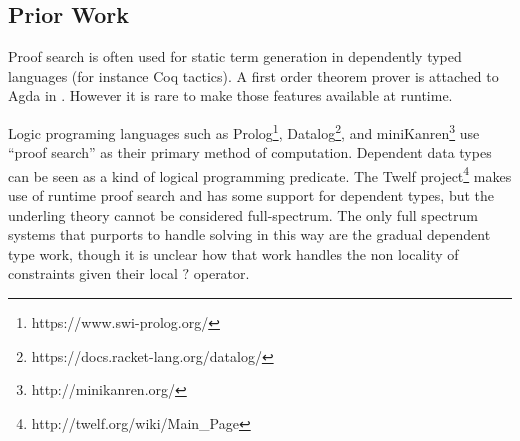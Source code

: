 \subsection{Prior Work}

Proof search is often used for static term generation in dependently
typed languages (for instance Coq tactics). A first order theorem
prover is attached to Agda in \cite{norell2007towards}. However it
is rare to make those features available at runtime. 

Logic programing languages such as Prolog\footnote{https://www.swi-prolog.org/},
Datalog\footnote{https://docs.racket-lang.org/datalog/}, and miniKanren\footnote{http://minikanren.org/}
use ``proof search'' as their primary method of computation. Dependent
data types can be seen as a kind of logical programming predicate.
The Twelf project\footnote{http://twelf.org/wiki/Main\_Page} makes
use of runtime proof search and has some support for dependent types,
but the underling theory cannot be considered full-spectrum. The only
full spectrum systems that purports to handle solving in this way
are the gradual dependent type work\cite{DBLP:journals/corr/abs-1906-06469},
though it is unclear how that work handles the non locality of constraints
given their local $?$ operator.
